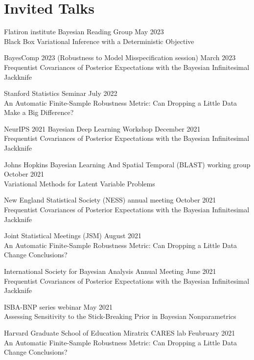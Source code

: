 \section{\sc Invited Talks}

Flatiron institute Bayesian Reading Group \hfill May 2023\\
Black Box Variational Inference with a Deterministic Objective

BayesComp 2023 (Robustness to Model Misspecification session) \hfill March 2023\\
Frequentist Covariances of Posterior Expectations
with the Bayesian Infinitesimal Jackknife


Stanford Statistics Seminar \hfill July 2022\\
An Automatic Finite-Sample Robustness Metric: Can Dropping a Little Data Make a Big Difference?

NeurIPS 2021 Bayesian Deep Learning Workshop
\hfill December 2021 \\
Frequentist Covariances of Posterior Expectations
with the Bayesian Infinitesimal Jackknife


Johns Hopkins Bayesian Learning And Spatial Temporal (BLAST) working group
\hfill October 2021\\
Variational Methods for Latent Variable Problems

New England Statistical Society (NESS) annual meeting
\hfill October 2021\\
Frequentist Covariances of Posterior Expectations
with the Bayesian Infinitesimal Jackknife

Joint Statistical Meetings (JSM)
\hfill August 2021\\
An Automatic Finite-Sample Robustness Metric: Can Dropping a Little Data
Change Conclusions?

International Society for Bayesian Analysis Annual Meeting
\hfill June 2021\\
Frequentist Covariances of Posterior Expectations
with the Bayesian Infinitesimal Jackknife

ISBA-BNP series webinar %
\hfill May 2021\\
Assessing Sensitivity to the Stick-Breaking Prior in Bayesian Nonparametrics

Harvard Graduate School of Education Miratrix CARES lab
\hfill Feubruary 2021\\
An Automatic Finite-Sample Robustness Metric: Can Dropping a Little Data
Change Conclusions?

